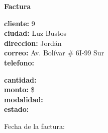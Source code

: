 \documentclass{article}
\begin{document}
\begin{center}
    {\LARGE \textbf{Factura}}\\[1cm]
\end{center}

\textbf{cliente:} 9 \\
\textbf{ciudad:} Luz Bustos \\
\textbf{direccion:} Jordán \\
\textbf{correo:} Av. Bolívar # 6I-99 Sur \\
\textbf{telefono:}  \\

\vspace{0.5cm}

\textbf{cantidad:}  \\
\textbf{monto:} \$ \\
\textbf{modalidad:}  \\
\textbf{estado:}  \\

\vspace{1cm}

Fecha de la factura: 
\end{document}
